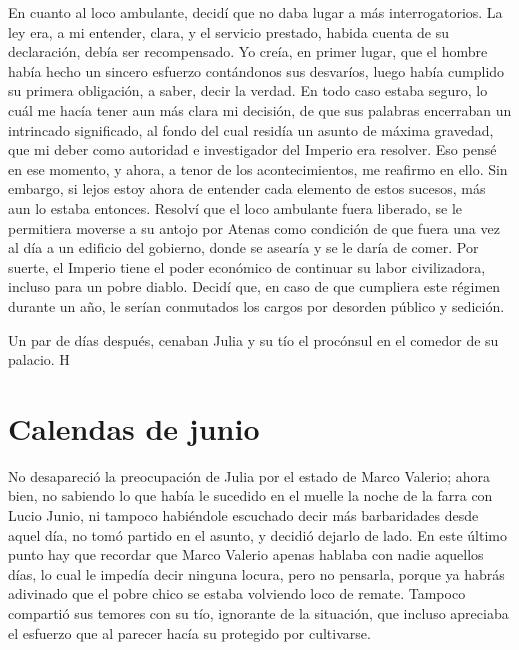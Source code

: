 \documentclass[11pt,openany]{book}
\begin{document}
En cuanto al loco ambulante, decidí que no daba lugar a más interrogatorios. La ley era, a mi entender, clara, y el servicio prestado, habida cuenta de su declaración, debía ser recompensado. Yo creía, en primer lugar, que el hombre había hecho un sincero esfuerzo contándonos sus desvaríos, luego había cumplido su primera obligación, a saber, decir la verdad. En todo caso estaba seguro, lo cuál me hacía tener aun más clara mi decisión, de que sus palabras encerraban un intrincado significado, al fondo del cual residía un asunto de máxima gravedad, que mi deber como autoridad e investigador del Imperio era resolver. Eso pensé en ese momento, y ahora, a tenor de los acontecimientos, me reafirmo en ello. Sin embargo, si lejos estoy ahora de entender cada elemento de estos sucesos, más aun lo estaba entonces. Resolví que el loco ambulante fuera liberado, se le permitiera moverse a su antojo por Atenas como condición de que fuera una vez al día a un edificio del gobierno, donde se asearía y se le daría de comer. Por suerte, el Imperio tiene el poder económico de continuar su labor civilizadora, incluso para un pobre diablo. Decidí que, en caso de que cumpliera este régimen durante un año, le serían conmutados los cargos por desorden público y sedición. 

\begin{center}
\end{center}

Un par de días después, cenaban Julia y su tío el procónsul en el comedor de su palacio. H

\chapter{Calendas de junio}

No desapareció la preocupación de Julia por el estado de Marco Valerio; ahora bien, no sabiendo lo que había le sucedido en el muelle la noche de la farra con Lucio Junio, ni tampoco habiéndole escuchado decir más barbaridades desde aquel día, no tomó partido en el asunto, y decidió dejarlo de lado. En este último punto hay que recordar que Marco Valerio apenas hablaba con nadie aquellos días, lo cual le impedía decir ninguna locura, pero no pensarla, porque ya habrás adivinado que el pobre chico se estaba volviendo loco de remate. Tampoco compartió sus temores con su tío, ignorante de la situación, que incluso apreciaba el esfuerzo que al parecer hacía su protegido por cultivarse. 
\end{document}
